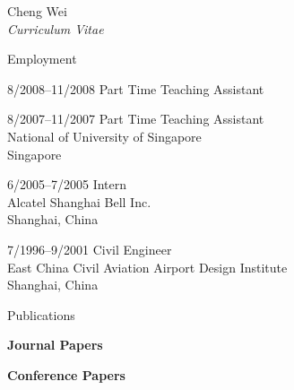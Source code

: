 \documentclass[10pt]{article}
\begin{document}
\begin{cv}{Cheng Wei\\{\large \itshape Curriculum Vitae}}
\begin{cvlist}{Employment}
    \item[8/2008--11/2008] Part Time Teaching Assistant
	\item[8/2007--11/2007] Part Time Teaching Assistant\\
	National of University of Singapore\\ 
	Singapore
	\item[6/2005--7/2005] Intern\\ 
	Alcatel Shanghai Bell Inc.\\
	Shanghai, China
        \item[7/1996--9/2001] Civil Engineer\\
        East China Civil Aviation Airport Design Institute\\
        Shanghai, China 
\end{cvlist}
\pagebreak



\setlength{\oldcvlabelwidth}{\cvlabelwidth}
\setlength{\cvlabelwidth}{1em}
\renewcommand*{\bibindent}{1.5em}
\renewcommand*{\biblabelsep}{1.5em}

\begin{cvlist}{Publications}
    \item \textbf{Journal Papers}
	\item \textbf{Conference Papers} 
\end{cvlist}
\setlength{\cvlabelwidth}{\oldcvlabelwidth}


\end{cv}
\end{document}
